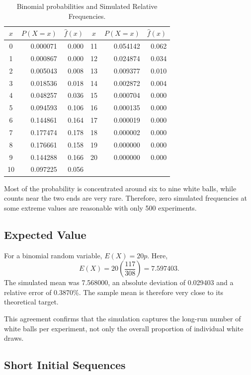 \documentclass[12pt]{article}
\theoremstyle{definition}
\numberwithin{equation}{section}
\begin{document}
\begin{table}[H]
\centering
\caption{Binomial probabilities and Simulated Relative Frequencies.}
\label{tab:binpmf}
\small
\begin{tabular}{crr@{\hspace{1.1cm}}crr}
\toprule
\(x\) & \(P(X=x)\) & \(\hat{f}(x)\) & \(x\) & \(P(X=x)\) & \(\hat{f}(x)\)\\
\midrule
0  & 0.000071 & 0.000 & 11 & 0.054142 & 0.062\\
1  & 0.000867 & 0.000 & 12 & 0.024874 & 0.034\\
2  & 0.005043 & 0.008 & 13 & 0.009377 & 0.010\\
3  & 0.018536 & 0.018 & 14 & 0.002872 & 0.004\\
4  & 0.048257 & 0.036 & 15 & 0.000704 & 0.000\\
5  & 0.094593 & 0.106 & 16 & 0.000135 & 0.000\\
6  & 0.144861 & 0.164 & 17 & 0.000019 & 0.000\\
7  & 0.177474 & 0.178 & 18 & 0.000002 & 0.000\\
8  & 0.176661 & 0.158 & 19 & 0.000000 & 0.000\\
9  & 0.144288 & 0.166 & 20 & 0.000000 & 0.000\\
10 & 0.097225 & 0.056 & & &\\
\bottomrule
\end{tabular}
\end{table}

Most of the probability is concentrated around six to nine white balls, while counts near the two ends are very rare. Therefore, zero simulated frequencies at some extreme values are reasonable with only 500 experiments.

\subsection{Expected Value}

For a binomial random variable, \(E(X)=20p\). Here,
\[
E(X)=20\left(\frac{117}{308}\right)=7.597403.
\]
The simulated mean was 7.568000, an absolute deviation of 0.029403 and a relative error of 0.3870\%. The sample mean is therefore very close to its theoretical target.

This agreement confirms that the simulation captures the long-run number of white balls per experiment, not only the overall proportion of individual white draws.

\subsection{Short Initial Sequences}
\end{document}
